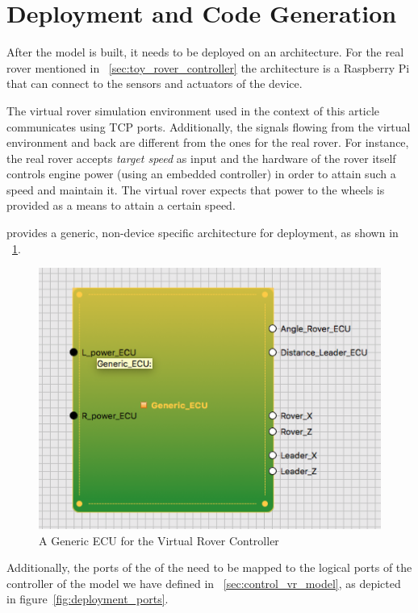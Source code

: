 \section{Deployment and Code Generation}
\label{sec:deploy_generate}

After the model is built, it needs to be deployed on an architecture. For the
real rover mentioned in \sect~\ref{sec:toy_rover_controller} the architecture
is a Raspberry Pi that can connect to the sensors and actuators of the device.

The virtual rover simulation environment used in the context of this article
communicates using TCP ports. Additionally, the signals flowing from the virtual
environment and back are different from the ones for the real rover. For
instance, the real rover accepts \emph{target speed} as input and the hardware
of the rover itself controls engine power (using an embedded \pid controller) in
order to attain such a speed and maintain it. The virtual rover expects that
power to the wheels is provided as a means to attain a certain speed.

\af provides a generic, non-device specific architecture for deployment, as
shown in \fig~\ref{fig:deployment_general}.

\begin{figure}[!h]
\centering
\includegraphics[width=.8\textwidth]{images/newECU.png}
\caption{A Generic ECU for the Virtual Rover Controller}
\label{fig:deployment_general}
\end{figure}

Additionally, the ports of the of the \ecu need to be mapped to the logical
ports of the controller of the model we have defined in
\sect~\ref{sec:control_vr_model}, as depicted in
figure~\ref{fig:deployment_ports}.

